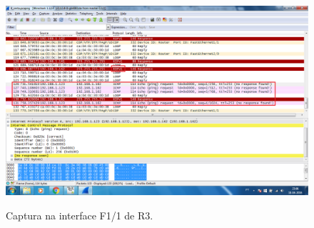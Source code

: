\begin{figure}[h]
\centering
\includegraphics[width=1\textwidth, height=0.45\textheight]{8.png}
\label{fig:captura}
\caption{Captura na interface F1/1 de \textsf{R3}.}
\end{figure}
